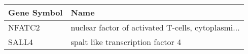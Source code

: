 \begin{tabular}{ll}
\toprule
Gene Symbol &                                               Name \\
\midrule
     NFATC2 & nuclear factor of activated T-cells, cytoplasmi... \\
      SALL4 &                  spalt like transcription factor 4 \\
\bottomrule
\end{tabular}
